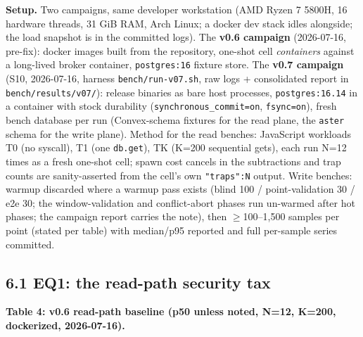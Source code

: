 \documentclass[
  11pt,
]{article}
\begin{document}
\textbf{Setup.} Two campaigns, same developer workstation (AMD Ryzen 7 5800H, 16 hardware threads, 31 GiB RAM, Arch Linux; a docker dev stack idles alongside; the load snapshot is in the committed logs). The \textbf{v0.6 campaign} (2026-07-16, pre-fix): docker images built from the repository, one-shot cell \emph{containers} against a long-lived broker container, \texttt{postgres:16} fixture store. The \textbf{v0.7 campaign} (S10, 2026-07-16, harness \texttt{bench/run-v07.sh}, raw logs + consolidated report in \texttt{bench/results/v07/}): release binaries as bare host processes, \texttt{postgres:16.14} in a container with stock durability (\texttt{synchronous\_commit=on}, \texttt{fsync=on}), fresh bench database per run (Convex-schema fixtures for the read plane, the \texttt{aster} schema for the write plane). Method for the read benches: JavaScript workloads T0 (no syscall), T1 (one \texttt{db.get}), TK (K=200 sequential gets), each run N=12 times as a fresh one-shot cell; spawn cost cancels in the subtractions and trap counts are sanity-asserted from the cell's own \texttt{"traps":N} output. Write benches: warmup discarded where a warmup pass exists (blind 100 / point-validation 30 / e2e 30; the window-validation and conflict-abort phases run un-warmed after hot phases; the campaign report carries the note), then $\ge$100--1,500 samples per point (stated per table) with median/p95 reported and full per-sample series committed.

\subsection{6.1 EQ1: the read-path security tax}\label{eq1-the-read-path-security-tax}

\textbf{Table 4: v0.6 read-path baseline (p50 unless noted, N=12, K=200, dockerized, 2026-07-16).}
\end{document}
